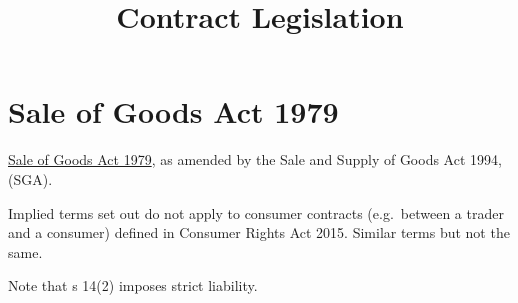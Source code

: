 \documentclass[
]{article}
\title{Contract Legislation}
\author{}
\date{}
\begin{document}
\maketitle

{
\setcounter{tocdepth}{3}
\tableofcontents
}
\hypertarget{sale-of-goods-act-1979}{%
\section{Sale of Goods Act 1979}\label{sale-of-goods-act-1979}}

\href{https://www.legislation.gov.uk/ukpga/1979/54/contents}{Sale of
Goods Act 1979}, as amended by the Sale and Supply of Goods Act 1994,
(SGA).

Implied terms set out do not apply to consumer contracts (e.g.~between a
trader and a consumer) defined in Consumer Rights Act 2015. Similar
terms but not the same.

Note that s 14(2) imposes strict liability.
\end{document}
